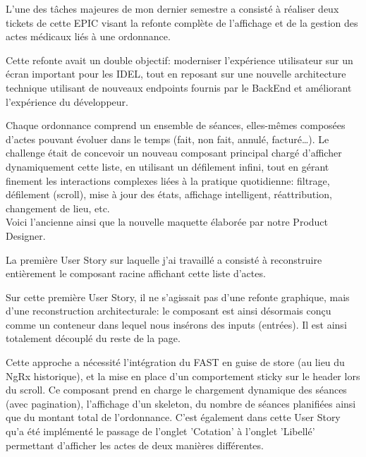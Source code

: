 \documentclass{article}
\begin{document}
L'une des tâches majeures de mon dernier semestre a consisté à réaliser deux tickets de cette EPIC visant la refonte complète de l'affichage et de la gestion des actes médicaux liés à une ordonnance.

Cette refonte avait un double objectif: moderniser l'expérience utilisateur sur un écran important pour les IDEL, tout en reposant sur une nouvelle architecture technique utilisant de nouveaux endpoints fournis par le BackEnd et améliorant l'expérience du développeur.

Chaque ordonnance comprend un ensemble de séances, elles-mêmes composées d'actes pouvant évoluer dans le temps (fait, non fait, annulé, facturé…). Le challenge était de concevoir un nouveau composant principal chargé d'afficher dynamiquement cette liste, en utilisant un défilement infini, tout en gérant finement les interactions complexes liées à la pratique quotidienne: filtrage, défilement (scroll), mise à jour des états, affichage intelligent, réattribution, changement de lieu, etc. \\

Voici l'ancienne ainsi que la nouvelle maquette élaborée par notre Product Designer.



La première User Story sur laquelle j'ai travaillé a consisté à reconstruire entièrement le composant racine affichant cette liste d'actes.

Sur cette première User Story, il ne s'agissait pas d'une refonte graphique, mais d'une reconstruction architecturale: le composant est ainsi désormais conçu comme un conteneur dans lequel nous insérons des inputs (entrées). Il est ainsi totalement découplé du reste de la page.

Cette approche a nécessité l'intégration du FAST en guise de store (au lieu du NgRx historique), et la mise en place d'un comportement sticky sur le header lors du scroll. Ce composant prend en charge le chargement dynamique des séances (avec pagination), l'affichage d'un skeleton, du nombre de séances planifiées ainsi que du montant total de l'ordonnance. C'est également dans cette User Story qu'a été implémenté le passage de l'onglet 'Cotation' à l'onglet 'Libellé' permettant d'afficher les actes de deux manières différentes. \\
\end{document}
